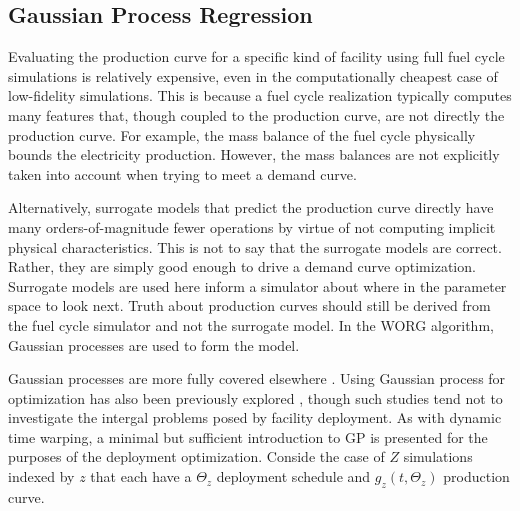\subsection{Gaussian Process Regression}
\label{gp}

Evaluating the production curve for a specific kind of facility using 
full fuel cycle simulations is relatively expensive, even in the 
computationally cheapest case of low-fidelity simulations. This is because a 
fuel cycle realization 
typically computes many features that, though coupled to the production 
curve, are not directly the production curve. For example, the mass balance of 
the fuel cycle physically bounds the electricity production. However, the    
mass balances are not explicitly taken into account when trying to meet
a demand curve.

Alternatively, surrogate models that predict the production curve directly
have many orders-of-magnitude fewer operations by virtue of not computing
implicit physical characteristics. This is not to say that the surrogate 
models are correct.  Rather, they are simply good enough to drive a demand
curve 
optimization. Surrogate models are used here inform a simulator about where
in the parameter space to look next. Truth about production curves should
still be derived from the fuel cycle simulator and not the surrogate model.
In the WORG algorithm, Gaussian processes are used to form the model. 

Gaussian processes are more fully covered elsewhere 
\cite{rasmussen2006gaussian}. Using Gaussian process for optimization has 
also been previously explored \cite{osborne2009gaussian}, though such studies 
tend not to 
investigate the intergal problems posed by facility deployment. As with 
dynamic time warping, a minimal but sufficient introduction to GP is presented 
for the purposes of the deployment optimization.
Conside the case of $Z$ simulations indexed by $z$ that each have a 
$\Theta_z$ deployment schedule and $g_z(t, \Theta_z)$ production curve.

